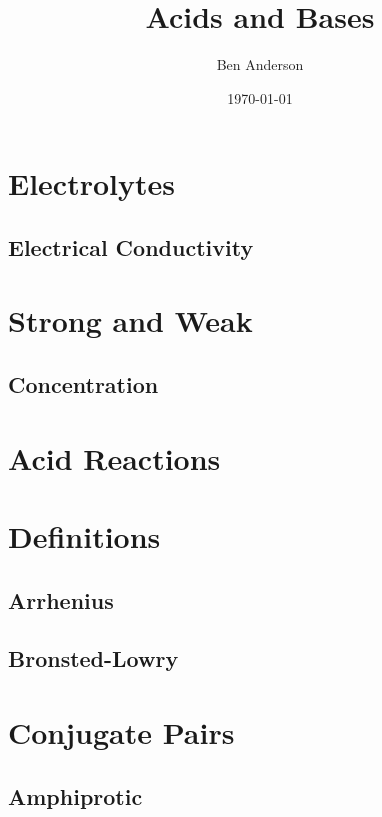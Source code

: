 \documentclass[a4paper,11pt]{article}
\begin{document}
\title{Acids and Bases}
\author{Ben Anderson}
\date{\today}
\maketitle
\pagebreak

\tableofcontents
\pagebreak


\section{Electrolytes}

\subsection{Electrical Conductivity}


\section{Strong and Weak}

\subsection{Concentration}


\section{Acid Reactions}

\section{Definitions}

\subsection{Arrhenius}

\subsection{Bronsted-Lowry}

\section{Conjugate Pairs}

\subsection{Amphiprotic}
\end{document}
